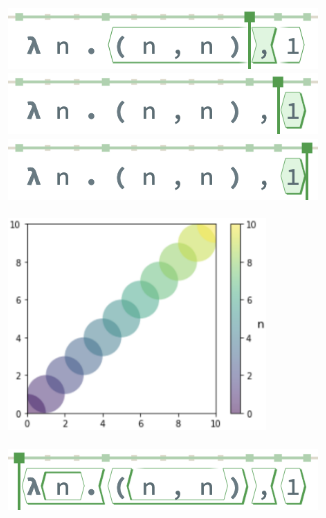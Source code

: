 \begin{figure}
\begin{subfigure}[c]{0.25\textwidth}
      \includegraphics[width=0.9\textwidth]{img/pan-terms-8.png}
      \includegraphics[width=0.9\textwidth]{img/pan-terms-9.png}
      \includegraphics[width=0.9\textwidth]{img/pan-terms-10.png}
      \caption{}
      \label{fig:pan-term-view}
  \end{subfigure}
  \begin{subfigure}[c]{0.45\textwidth}
    \centering
    \includegraphics[width=0.75\textwidth]{img/circles-n-n-1.png}
    \caption{}
    \label{fig:default-circles}
  \end{subfigure}
  \begin{subfigure}[c]{0.25\textwidth}
    \centering
    \includegraphics[width=0.9\textwidth]{img/pan-tiles-0.png}

\end{subfigure}
\end{figure}
